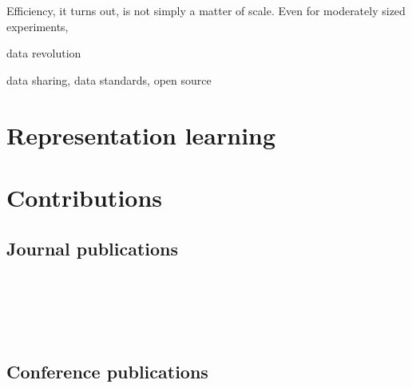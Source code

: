 Efficiency, it turns out, is not simply a matter of scale. Even for moderately sized experiments,

%

data revolution


data sharing, data standards, open source

\section{Representation learning}

\section{Contributions}

\subsection*{Journal publications}
 \\ \\
 \\ \\

\subsection*{Conference publications}
 \\ \\
